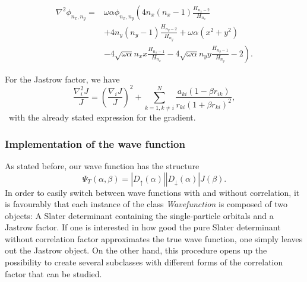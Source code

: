 \begin{align*}
\nabla ^ 2 \phi_{n_x,n_y}  =  &\omega\alpha  \phi_{n_x,n_y} \left(  4n_x(n_x-1)\frac{H_{n_x-2}}{H_{n_x}}\right.\\
& \left.+ 4n_y(n_y-1)\frac{H_{n_y-2}}{H_{n_y}} + \omega\alpha \left(x^ 2+y^ 2\right)\right. \\
& \left.- 4 \sqrt{\omega\alpha}n_x x \frac{H_{n_x-1}}{H_{n_x}} -  4 \sqrt{\omega\alpha}n_y y \frac{H_{n_y-1}}{H_{n_y}} -2   \right).
\end{align*}

For the Jastrow factor, we have
\begin{equation}
\frac{\nabla_i^2 J}{J} = \left(\frac{\nabla_i J}{J}\right)^2 + \sum\limits_{k=1,k\neq i}^{N}\frac{a_{ki}(1-\beta r_{ik})}{r_{ki}(1+\beta r_{ki})^ 2},
\end{equation}
\
with the already stated expression for the gradient.

\subsubsection{Implementation of the wave function}
As stated before, our wave function has the structure
\begin{equation}
\Psi_T(\alpha, \beta ) = \left| D_{\uparrow}(\alpha)\right| \left| D_{\downarrow}(\alpha)\right| J(\beta).
\end{equation}
In order to easily switch between wave functions with and without correlation, it is favourably that each instance of the class \textit{Wavefunction} is composed of two objects: 
A Slater determinant containing the single-particle orbitals  and a Jastrow factor. If one is interested in how good the pure Slater determinant without correlation factor approximates the true wave function, one simply leaves out the Jastrow object. On the other hand, this procedure opens up the possibility to create several subclasses with different forms of the correlation factor that can be studied.

